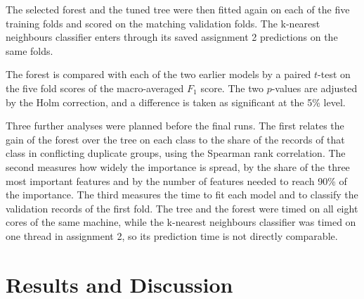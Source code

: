 \documentclass[conference,10pt]{IEEEtran}
\begin{document}
The selected forest and the tuned tree were then fitted again on each of the
five training folds and scored on the matching validation folds.   The
k-nearest neighbours classifier enters through its saved assignment 2
predictions on the same folds.

The forest is compared with each of the two earlier models by a paired
$t$-test on the five fold scores of the macro-averaged $F_1$ score. The two
$p$-values are adjusted by the Holm correction, and a difference is taken
as significant at the 5\% level. 

Three further analyses were planned before the final runs. The first
relates the gain of the forest over the tree on each class to the share of
the records of that class in conflicting duplicate groups, using the
Spearman rank correlation. The second measures how widely the importance is
spread, by the share of the three most important features and by the
number of features needed to reach 90\% of the importance. The third
measures the time to fit each model and to classify the validation records
of the first fold. The tree and the forest were timed on all eight cores of
the same machine, while the k-nearest neighbours classifier was timed on
one thread in assignment 2, so its prediction time is not directly
comparable.

\section{Results and Discussion}
\label{sec:results}
\end{document}
